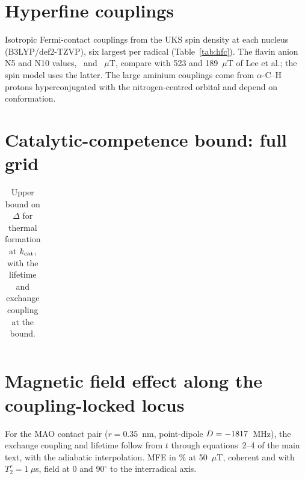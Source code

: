 \documentclass[11pt]{article}
\begin{document}
\section{Hyperfine couplings}
Isotropic Fermi-contact couplings from the UKS spin density at each nucleus
(B3LYP/def2-TZVP), six largest per radical (Table~\ref{tab:hfc}). The flavin
anion N5 and N10 values, \aNfiveDFT\ and \aNtenDFT~$\mu$T, compare with 523 and
189~$\mu$T of Lee et al.; the spin model uses the latter. The large aminium
couplings come from $\alpha$-C--H protons hyperconjugated with the
nitrogen-centred orbital and depend on conformation.

\begin{table}[h]\centering\small
\caption{DFT isotropic hyperfine couplings.}\label{tab:hfc}

\end{table}

\section{Catalytic-competence bound: full grid}
\begin{longtable}{c}
\caption{Upper bound on $\Delta$ for thermal formation at $k_{\rm cat}$, with the
lifetime and exchange coupling at the bound.}\label{tab:competence}\\

\end{longtable}

\section{Magnetic field effect along the coupling-locked locus}
For the MAO contact pair ($r = 0.35$~nm, point-dipole $D = -1817$~MHz), the
exchange coupling and lifetime follow from $t$ through equations~2--4 of the main
text, with the adiabatic interpolation. MFE in \% at 50~$\mu$T, coherent and with
$T_2^e = 1~\mu$s, field at 0 and 90$^\circ$ to the interradical axis.

\begin{table}[h]\centering\footnotesize
\caption{Inverted region, $\Delta = 1.78$, $\lambda = 0.97$~eV.}\label{tab:locinv}

\end{table}

\begin{table}[h]\centering\footnotesize
\caption{Activationless, $\Delta = \lambda = 1.0$~eV.}\label{tab:locact}

\end{table}
\end{document}
